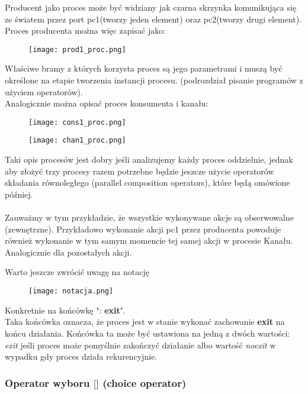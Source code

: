 \documentclass[a4paper,15pt]{article}
\begin{document}
Producent jako proces może być widziany jak czarna skrzynka komunikująca się ze światem przez port pc1(tworzy jeden element) oraz pc2(tworzy drugi element). Proces producenta można więc zapisać jako:
\begin{figure}[H]
\centerline{\texttt{[image: prod1\_proc.png]}}
\label{fig:prod1_proc}
\end{figure}
Właściwe bramy z których korzysta proces są jego parametrami i muszą być określone na etapie tworzenia instancji procesu. (podrozdział pisanie programów z użyciem operatorów). \\
Analogicznie można opisać proces konsumenta i kanału:
\begin{figure}[H]
\centerline{\texttt{[image: cons1\_proc.png]}}
\label{fig:cons1_proc}
\end{figure}
\begin{figure}[H]
\centerline{\texttt{[image: chan1\_proc.png]}}
\label{fig:chan1_proc}
\end{figure}
Taki opis procesów jest dobry jeśli analizujemy każdy proces oddzielnie, jednak aby złożyć trzy procesy razem potrzebne będzie jeszcze użycie operatorów składania równoległego (parallel composition operators), które będą omówione później. \\ \\
Zauważmy w tym przykładzie, że wszystkie wykonywane akcje są obserwowalne (zewnętrzne). Przykładowo wykonanie akcji pc1 przez producenta powoduje również wykonanie w tym samym momencie tej samej akcji w procesie Kanału. Analogicznie dla pozostałych akcji.

\newpage
Warto jeszcze zwrócić uwagę na notację 
\begin{figure}[H]
\centerline{\texttt{[image: notacja.png]}}
\label{fig:chan1_proc}
\end{figure}
Konkretnie na końcówkę ":\textbf{ exit}". \\
Taka końcówka oznacza, że proces jest w stanie wykonać zachowanie \textbf{exit} na końcu działania. Końcówka ta może być ustawiona na jedną z dwóch wartości: \textit{exit} jeśli proces może pomyślnie zakończyć działanie albo wartość \textit{noexit} w wypadku gdy proces działa rekurencyjnie. 



\newpage
\subsubsection{Operator wyboru $\lbrack \rbrack$ (choice operator)} 
\end{document}
